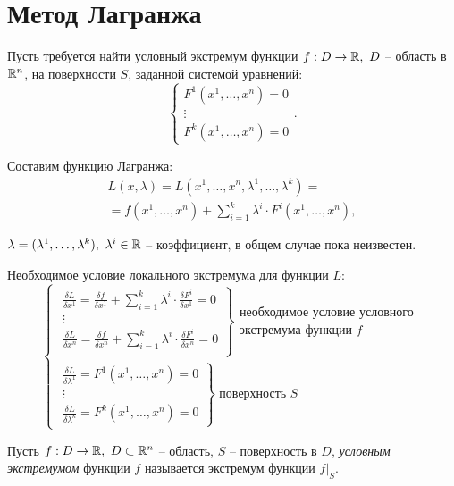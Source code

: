 \newpage

\section*{Метод Лагранжа}

\begin{task}
    Пусть требуется найти условный экстремум функции $f:D\rightarrow\mathbb{R}, \ D$ -- область в $\mathbb{R}^n$, на поверхности $S$, заданной системой уравнений:
    \[
        \left\{\begin{array}{l}
            F^1(x^1,\ldots,x^n) = 0 \\
            \vdots                  \\
            F^k(x^1,\ldots,x^n) = 0
          \end{array}\right..
    \]
    
    Составим функцию Лагранжа:
    \begin{multline*}
      L(x,\lambda) = L(x^1,\ldots,x^n,\lambda^1,\ldots,\lambda^k) = \\
      = f(x^1,\ldots,x^n) + \sum_{i=1}^{k}\lambda^i\cdot F^i(x^1,\ldots,x^n),
    \end{multline*}
    
    $\lambda = (\lambda^1,\ldots,\lambda^k), \ \lambda^i \in \R$ -- коэффициент, в общем случае пока неизвестен.
    
    Необходимое условие локального экстремума для функции $L:$
    \begin{equation}\label{eq:24}
      \left\{\begin{array}{l}
        \left.\begin{array}{l}
            \frac{\delta L}{\delta x^1} = \frac{\delta f}{\delta x^1} + \sum_{i = 1}^{k}\lambda^i\cdot\frac{\delta F^i}{\delta x^1} = 0 \\
            \vdots                                                                                                                      \\
            \frac{\delta L}{\delta x^n} = \frac{\delta f}{\delta x^n} + \sum_{i = 1}^{k}\lambda^i\cdot\frac{\delta F^i}{\delta x^n} = 0 \\
        \end{array}\right\}\begin{array}{l}
            \text{необходимое условие условного}\\
            \text{экстремума функции }f
        \end{array} \\
        \left.\begin{array}{l}
            \frac{\delta L}{\delta \lambda^1} = F^1(x^1,\ldots,x^n) = 0                                                                 \\
            \vdots                                                                                                                      \\
            \frac{\delta L}{\delta \lambda^k} = F^k(x^1,\ldots,x^n) = 0
        \end{array}\right\}\text{ поверхность }S
      \end{array}\right.
    \end{equation}
\end{task}

\begin{definition}
  Пусть $f:D\rightarrow\mathbb{R}, \ D \subset \mathbb{R}^n$ -- область, $S$ -- поверхность в $D$, \emph{условным экстремумом} функции $f$ называется экстремум функции $f\big|_S$.
\end{definition}